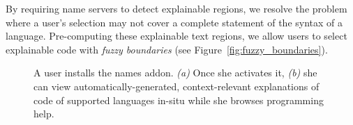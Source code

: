 By requiring \gls{name} servers to detect explainable regions, we resolve the problem where a user's selection may not cover a complete statement of the syntax of a language.
Pre-computing these explainable text regions, we allow users to select explainable code with \emph{fuzzy boundaries} (see Figure~\ref{fig:fuzzy_boundaries}).

\begin{figure}
    \centering
    \label{fig:browser_tutorons_markup}
    \caption{A user installs the \Glspl{name} addon.  \emph{(a)} Once she activates it, \emph{(b)} she can view automatically-generated, context-relevant explanations of code of supported languages in-situ while she browses programming help.}
\end{figure}

